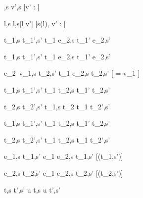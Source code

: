   { }
  {\Enter \tau,s  \Edit v',s}
  [v' : \tau]

  { }
  {\Update l,s  \Update l,s[l \mapsto v']{}}
  [s(l), v' : \tau]


  {t_1,s  t_1',s'}
  {t_1 \Then e_2,s  t_1' \Then e_2,s'}

  {t_1,s  t_1',s'}
  {t_1 \Next e_2,s  t_1' \Next e_2,s'}

  {e_2\ v_1,s \normalise t_2,s'}
  {t_1 \Next e_2,s \handle{\Continue} t_2,s'}
  [ = v_1 \wedge \neg{}]


  {t_1,s  t_1',s' }
  {t_1 \And t_2,s  t_1' \And t_2,s'}

  {t_2,s  t_2',s'}
  {t_1,s \And t_2  t_1 \And t_2',s'}


  {t_1,s  t_1',s'}
  {t_1 \Or t_2,s  t_1' \Or t_2,s'}

  {t_2,s  t_2',s' }
  {t_1 \Or t_2,s  t_1 \Or t_2',s'}


  {e_1,s \normalise t_1,s'}
  {e_1 \Xor e_2,s \handle{\Left} t_1,s'}
  [\neg\Failing(t_1,s')]

  {e_2,s \normalise t_2,s'}
  {e_1 \Xor e_2,s \handle{\Right} t_2,s'}
  [\neg\Failing(t_2,s')]


  {t,s  t',s'}
  {u \At t,s u \At t',s'}









